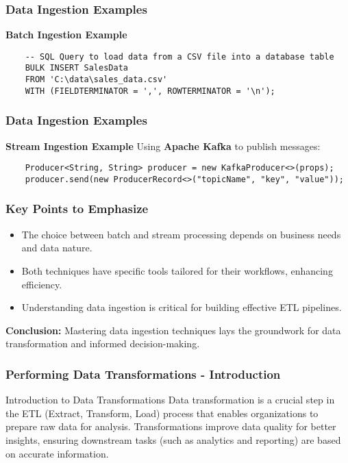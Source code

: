 \documentclass{beamer}
\begin{document}
\begin{frame}[fragile]
    \frametitle{Data Ingestion Examples}
    \textbf{Batch Ingestion Example}
    \begin{lstlisting}
    -- SQL Query to load data from a CSV file into a database table
    BULK INSERT SalesData
    FROM 'C:\data\sales_data.csv'
    WITH (FIELDTERMINATOR = ',', ROWTERMINATOR = '\n');
    \end{lstlisting}
\end{frame}

\begin{frame}[fragile]
    \frametitle{Data Ingestion Examples}
    \textbf{Stream Ingestion Example}
    Using \textbf{Apache Kafka} to publish messages:
    \begin{lstlisting}
    Producer<String, String> producer = new KafkaProducer<>(props);
    producer.send(new ProducerRecord<>("topicName", "key", "value"));
    \end{lstlisting}
\end{frame}

\begin{frame}
    \frametitle{Key Points to Emphasize}
    \begin{itemize}
        \item The choice between batch and stream processing depends on business needs and data nature.
        \item Both techniques have specific tools tailored for their workflows, enhancing efficiency.
        \item Understanding data ingestion is critical for building effective ETL pipelines.
    \end{itemize}
    \textbf{Conclusion:} Mastering data ingestion techniques lays the groundwork for data transformation and informed decision-making.
\end{frame}

\begin{frame}[fragile]
    \frametitle{Performing Data Transformations - Introduction}
    \begin{block}{Introduction to Data Transformations}
        Data transformation is a crucial step in the ETL (Extract, Transform, Load) process that enables organizations to prepare raw data for analysis. 
        Transformations improve data quality for better insights, ensuring downstream tasks (such as analytics and reporting) are based on accurate information.
    \end{block}
\end{frame}
\end{document}
